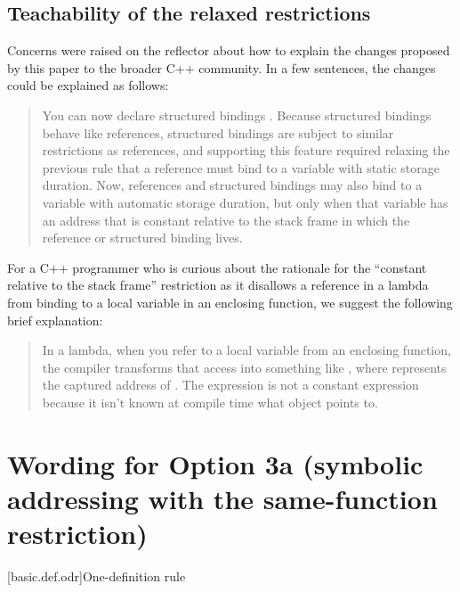 \documentclass{wg21}
\begin{document}
\subsection{Teachability of the relaxed restrictions}
Concerns were raised on the reflector about how to explain the changes proposed
by this paper to the broader C++ community. In a few sentences, the changes
could be explained as follows:
\begin{quote}
You can now declare structured bindings . Because structured
bindings behave like references,  structured bindings are
subject to similar restrictions as  references, and supporting
this feature required relaxing the previous rule that a 
reference must bind to a variable with static storage duration. Now,
 references and structured bindings may also bind to a
variable with automatic storage duration, but only when that variable has an
address that is constant relative to the stack frame in which the reference or
structured binding lives.
\end{quote}
For a C++ programmer who is curious about the rationale for the ``constant
relative to the stack frame'' restriction as it disallows a 
reference in a lambda from binding to a local variable in an enclosing
function, we suggest the following brief explanation:
\begin{quote}
In a lambda, when you refer to a local variable  from an enclosing
function, the compiler transforms that access into something like
, where  represents the captured address of
. The expression  is not a constant expression
because it isn't known at compile time what object  points to.
\end{quote}

\section{Wording for Option 3a (symbolic addressing with the same-function restriction)}

[basic.def.odr]{One-definition rule}%

\end{document}
